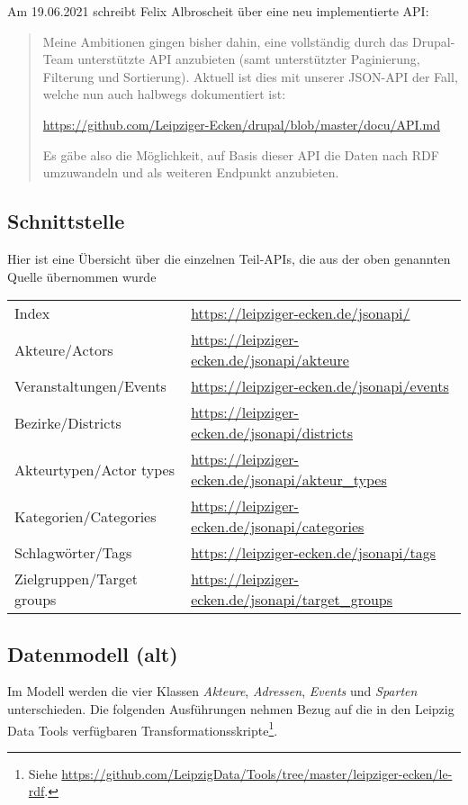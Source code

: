 \documentclass[a4paper,11pt]{article}
\begin{document}
Am 19.06.2021 schreibt Felix Albroscheit über eine neu implementierte API:
\begin{quote}
  Meine Ambitionen gingen bisher dahin, eine vollständig durch das Drupal-Team
  unterstützte API anzubieten (samt unterstützter Paginierung, Filterung und
  Sortierung). Aktuell ist dies mit unserer JSON-API der Fall, welche nun auch
  halbwegs dokumentiert ist:
  \begin{center}
    \url{https://github.com/Leipziger-Ecken/drupal/blob/master/docu/API.md}    
  \end{center}
  Es gäbe also die Möglichkeit, auf Basis dieser API die Daten nach RDF
  umzuwandeln und als weiteren Endpunkt anzubieten. 
\end{quote}

\subsection{Schnittstelle}

Hier ist eine Übersicht über die einzelnen Teil-APIs, die aus der oben
genannten Quelle übernommen wurde
\begin{center}
  \begin{tabular}{ll}
    Index & \url{https://leipziger-ecken.de/jsonapi/}\\
    Akteure/Actors & \url{https://leipziger-ecken.de/jsonapi/akteure}\\
    Veranstaltungen/Events & \url{https://leipziger-ecken.de/jsonapi/events}\\
    Bezirke/Districts & \url{https://leipziger-ecken.de/jsonapi/districts}\\
    Akteurtypen/Actor types &
    \url{https://leipziger-ecken.de/jsonapi/akteur_types}\\
    Kategorien/Categories &
    \url{https://leipziger-ecken.de/jsonapi/categories}\\
    Schlagwörter/Tags & \url{https://leipziger-ecken.de/jsonapi/tags}\\  
    Zielgruppen/Target groups &
    \url{https://leipziger-ecken.de/jsonapi/target_groups}
  \end{tabular}
\end{center}


\subsection{Datenmodell (alt)}

Im Modell werden die vier Klassen \emph{Akteure}, \emph{Adressen},
\emph{Events} und \emph{Sparten} unterschieden.  Die folgenden Ausführungen
nehmen Bezug auf die in den Leipzig Data Tools verfügbaren
Transformationsskripte\footnote{Siehe
  \url{https://github.com/LeipzigData/Tools/tree/master/leipziger-ecken/le-rdf}.}. 
\end{document}
